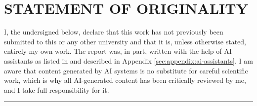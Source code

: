 \documentclass[../ShajiS_RnDReport.tex]{subfiles}
\begin{document}
    \section*{STATEMENT OF ORIGINALITY}


    \noindent I, the undersigned below, declare that this work has not previously been submitted to this or any other university and that it is, unless otherwise stated, entirely my own work. The report was, in part, written with the help of AI assistants as listed in and described in Appendix \ref{sec:appendix:ai-assistants}. I am aware that content generated by AI systems is no substitute for careful scientific work, which is why all AI-generated content has been critically reviewed by me, and I take full responsibility for it.



    \vspace{1cm}

    \hrule width 0.45\linewidth
    \hfill \hspace{0.025\linewidth}
    \hrulefill

\end{document}
